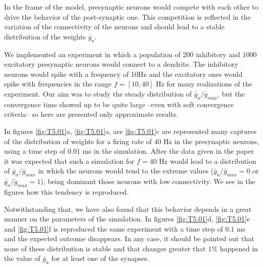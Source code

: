 \documentclass[a4paper,12pt,oneside]{article}
\begin{document}
		In the frame of the model, presynaptic neurons would compete with each other to drive the behavior of the post-synaptic one. This competition is reflected in the variation of the connectivity of the neurons and should lead to a stable distribution of the weights $\bar{g}_a$. 
		
		We implemented an experiment in which a population of $200$ inhibitory and $1000$ excitatory presynaptic neurons would connect to a dendrite. The inhibitory neurons would spike with a frequency of 10Hz and the excitatory ones would spike with frequencies in the range $f=[10,40]$ Hz for many realizations of the experiment. Our aim was to study the steady distribution of $\bar{g}_a/\bar{g}_{max}$, but the convergence time showed up to be quite large --even with soft convergence criteria-- so here are presented only approximate results. 
		
		In figures \ref{fig:T5.01}a, \ref{fig:T5.01}a, are \ref{fig:T5.01}c are represented many captures of the distribution of weights for a firing rate of $40$ Hz in the presynaptic neurons, using a time step of $0.01$ ms in the simulation. After the data given in the paper \cite{paper} it was expected that such a simulation for $f=40$ Hz would lead to a distribution of $\bar{g}_a/\bar{g}_{max}$ in which the neurons would tend to the extreme values ($\bar{g}_a/\bar{g}_{max}=0$ or $\bar{g}_a/\bar{g}_{max}=1$), being dominant those neurons with low connectivity. We see in the figures how this tendency is reproduced. 
		
		Notwithstanding that, we have also found that this behavior depends in a great manner on the parameters of the simulation. In figures \ref{fig:T5.01}d, \ref{fig:T5.01}e and \ref{fig:T5.01}f is reproduced the same experiment with a time step of $0.1$ ms and the expected outcome disappears. In any case, it should be pointed out that none of these distribution is stable and that changes greater that $1\%$ happened in the value of $\bar{g}_a$ for at least one of the synapses. 
		
\end{document}
